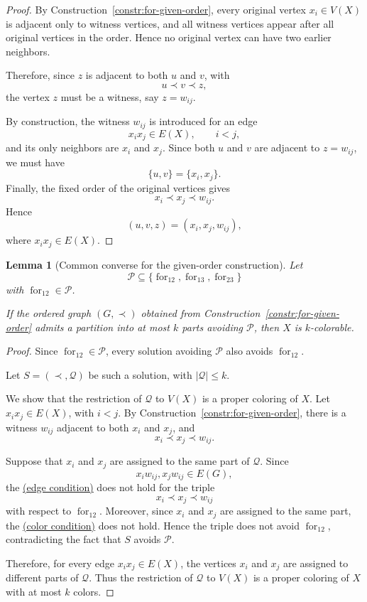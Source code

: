 \documentclass[12pt]{article}
\theoremstyle{plain}
\newtheorem{lemma}[theorem]{Lemma}
\theoremstyle{definition}
\theoremstyle{remark}
\theoremstyle{definition}
\newcommand{\edgecondition}{%
  \hyperref[def:avoid:cond:edge]{(edge condition)}\xspace
}
\newcommand{\colorcondition}{%
  \hyperref[def:avoid:cond:color]{(color condition)}\xspace
}
\newcommand{\forlabel}{\mathrm{for}}
\DeclareRobustCommand{\forparam}[1]{%
  \ensuremath{\mathop{\forlabel}\nolimits_{#1}}%
}
\begin{document}
\begin{proof}
By Construction~\ref{constr:for-given-order}, every original vertex
\(x_i\in V(X)\) is adjacent only to witness vertices, and all witness
vertices appear after all original vertices in the order. Hence no
original vertex can have two earlier neighbors.

Therefore, since \(z\) is adjacent to both \(u\) and \(v\), with
\[
u\prec v\prec z,
\]
the vertex \(z\) must be a witness, say \(z=w_{ij}\).

By construction, the witness \(w_{ij}\) is introduced for an edge
\[
x_ix_j\in E(X),
\qquad i<j,
\]
and its only neighbors are \(x_i\) and \(x_j\). Since both \(u\) and
\(v\) are adjacent to \(z=w_{ij}\), we must have
\[
\{u,v\}=\{x_i,x_j\}.
\]
Finally, the fixed order of the original vertices gives
\[
x_i\prec x_j\prec w_{ij}.
\]
Hence
\[
(u,v,z)=(x_i,x_j,w_{ij}),
\]
where \(x_ix_j\in E(X)\).
\end{proof}


\begin{lemma}[Common converse for the given-order construction]
\label{lem:for-given-order-common-converse}
Let
\[
\mathcal P\subseteq
\{\forparam{12},\forparam{13},\forparam{23}\}
\]
with \(\forparam{12}\in\mathcal P\).

If the ordered graph \((G,\prec)\) obtained from
Construction~\ref{constr:for-given-order}
admits a partition into at most \(k\) parts avoiding \(\mathcal P\),
then \(X\) is \(k\)-colorable.
\end{lemma}

\begin{proof}
Since \(\forparam{12}\in\mathcal P\), every solution avoiding
\(\mathcal P\) also avoids \(\forparam{12}\).

Let
\(
S=(\prec,\mathcal Q)
\)
be such a solution, with \(|\mathcal Q|\le k\).

We show that the restriction of \(\mathcal Q\) to \(V(X)\) is a proper
coloring of \(X\). Let \(x_i x_j\in E(X)\), with \(i<j\). By
Construction~\ref{constr:for-given-order}, there is a witness \(w_{ij}\)
adjacent to both \(x_i\) and \(x_j\), and
\[
x_i\prec x_j\prec w_{ij}.
\]

Suppose that \(x_i\) and \(x_j\) are assigned to the same part of
\(\mathcal Q\). Since
\[
x_iw_{ij},x_jw_{ij}\in E(G),
\]
the \edgecondition{} does not hold for the triple
\[
x_i\prec x_j\prec w_{ij}
\]
with respect to \(\forparam{12}\). Moreover, since \(x_i\) and \(x_j\)
are assigned to the same part, the \colorcondition{} does not hold.
Hence the triple does not avoid \(\forparam{12}\), contradicting the
fact that \(S\) avoids \(\mathcal P\).

Therefore, for every edge \(x_i x_j\in E(X)\), the vertices \(x_i\) and
\(x_j\) are assigned to different parts of \(\mathcal Q\). Thus the
restriction of \(\mathcal Q\) to \(V(X)\) is a proper coloring of \(X\)
with at most \(k\) colors.
\end{proof}
\end{document}
